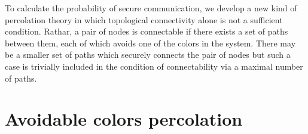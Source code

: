 \documentclass[aps, pre, twocolumn, a4paper, floatfix]{revtex4}
\begin{document}

To calculate the probability of secure communication, we develop a new kind of percolation theory in which topological connectivity alone is not a sufficient condition.
Rathar, a pair of nodes is connectable if there exists a set of paths between them, each of which avoids one of the colors in the system.
There may be a smaller set of paths which securely connects the pair of nodes but such a case is trivially included in the condition of connectability via a maximal number of paths.

%
%
%
%



\section{Avoidable colors percolation}
\end{document}
